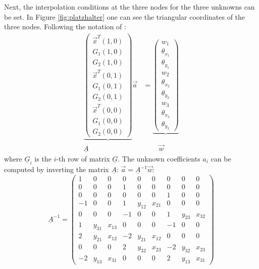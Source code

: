   Next, the interpolation conditions at the three nodes for the three unknowns can be set. In Figure \ref{fig:platzhalter} one can see the triangular coordinates of the three nodes. Following the notation of \cite{steinke2005finite}:
  \begin{align}
  \underbrace{\begin{pmatrix}
  	\vec{x}^T(1,0)\\G_1(1,0)\\G_2(1,0)\\
  	\vec{x}^T(0,1)\\G_1(0,1)\\G_2(0,1)\\
  	\vec{x}^T(0,0)\\G_1(0,0)\\G_2(0,0)
  	\end{pmatrix}} \vec{a} &= \underbrace{\begin{pmatrix}
  	w_1\\\theta_{x_1}\\\theta_{y_1}\\
  	w_2\\\theta_{x_2}\\\theta_{y_2}\\
  	w_3\\\theta_{x_3}\\\theta_{y_3}
  	\end{pmatrix}}\\
  \underline{A}\qquad\quad &\qquad\ \vec{w}
  \end{align}
  where $\underline{G}_i$ is the $i$-th row of matrix $\underline{G}$.
  The unknown coefficients $a_i$ can be computed by inverting the matrix $\underline{A}$: $\vec{a} = \underline{A}^{-1} \vec{w}$:
  \begin{equation}
  \underline{A}^{-1} = \begin{pmatrix}
  1& 0& 0& 0& 0& 0& 0& 0& 0\\
  0& 0& 0& 1& 0& 0& 0& 0& 0\\
  0& 0& 0& 0& 0& 0& 1& 0& 0\\
  -1& 0& 0& 1& y_{12}& x_{21}& 0& 0& 0\\
  0& 0& 0& -1& 0& 0& 1& y_{23}& x_{32}\\
  1& y_{31}& x_{13}& 0& 0& 0& -1& 0& 0\\
  2& y_{21}& x_{12}& -2& y_{21}& x_{12}& 0& 0& 0\\
  0& 0& 0& 2& y_{32}& x_{23}& -2& y_{32}& x_{23}\\
  -2& y_{13}& x_{31}& 0& 0& 0& 2& y_{13}& x_{31}
  \end{pmatrix}
  \end{equation}
